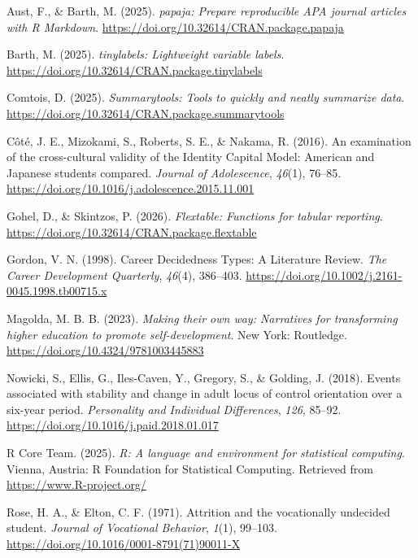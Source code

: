 \documentclass[
  english,
  man,floatsintext]{apa6}
\newlength{\cslhangindent}
\newenvironment{CSLReferences}[2] %
 {\begin{list}{}{%
  \setlength{\itemindent}{0pt}
  \setlength{\leftmargin}{0pt}
  \setlength{\parsep}{0pt}
  \ifodd #1
   \setlength{\leftmargin}{\cslhangindent}
   \setlength{\itemindent}{-1\cslhangindent}
  \fi
  \setlength{\itemsep}{#2\baselineskip}}}
 {\end{list}}
\begin{document}
\label{refs}
\begin{CSLReferences}{1}{0}
Aust, F., \& Barth, M. (2025). \emph{{papaja}: {Prepare} reproducible {APA} journal articles with {R Markdown}}. \url{https://doi.org/10.32614/CRAN.package.papaja}

Barth, M. (2025). \emph{{tinylabels}: Lightweight variable labels}. \url{https://doi.org/10.32614/CRAN.package.tinylabels}

Comtois, D. (2025). \emph{Summarytools: Tools to quickly and neatly summarize data}. \url{https://doi.org/10.32614/CRAN.package.summarytools}

Côté, J. E., Mizokami, S., Roberts, S. E., \& Nakama, R. (2016). An examination of the cross-cultural validity of the Identity Capital Model: American and Japanese students compared. \emph{Journal of Adolescence}, \emph{46}(1), 76--85. \url{https://doi.org/10.1016/j.adolescence.2015.11.001}

Gohel, D., \& Skintzos, P. (2026). \emph{Flextable: Functions for tabular reporting}. \url{https://doi.org/10.32614/CRAN.package.flextable}

Gordon, V. N. (1998). Career Decidedness Types: A Literature Review. \emph{The Career Development Quarterly}, \emph{46}(4), 386--403. \url{https://doi.org/10.1002/j.2161-0045.1998.tb00715.x}

Magolda, M. B. B. (2023). \emph{Making their own way: Narratives for transforming higher education to promote self-development}. New York: Routledge. \url{https://doi.org/10.4324/9781003445883}

Nowicki, S., Ellis, G., Iles-Caven, Y., Gregory, S., \& Golding, J. (2018). Events associated with stability and change in adult locus of control orientation over a six-year period. \emph{Personality and Individual Differences}, \emph{126}, 85--92. \url{https://doi.org/10.1016/j.paid.2018.01.017}

R Core Team. (2025). \emph{R: A language and environment for statistical computing}. Vienna, Austria: R Foundation for Statistical Computing. Retrieved from \url{https://www.R-project.org/}

Rose, H. A., \& Elton, C. F. (1971). Attrition and the vocationally undecided student. \emph{Journal of Vocational Behavior}, \emph{1}(1), 99--103. \url{https://doi.org/10.1016/0001-8791(71)90011-X}


\end{CSLReferences}
\end{document}
